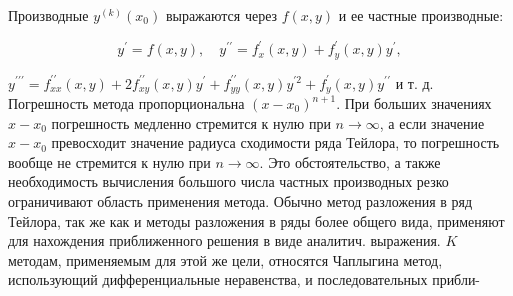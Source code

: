 \documentclass[10pt]{article}
\begin{document}
Производные $y^{(k)}\left(x_{0}\right)$ выражаются через $f(x, y)$ и ее частные производные:



\[

y^{\prime}=f(x, y), \quad y^{\prime \prime}=f_{x}^{\prime}(x, y)+f_{y}^{\prime}(x, y) y^{\prime},

\]



$y^{\prime \prime \prime}=f_{x x}^{\prime \prime}(x, y)+2 f_{x y}^{\prime \prime}(x, y) y^{\prime}+f_{y y}^{\prime \prime}(x, y) y^{\prime 2}+f_{y}^{\prime}(x, y) y^{\prime \prime}$ и т. д. Погрешность метода пропорциональна $\left(x-x_{0}\right)^{n+1}$. При больших значениях $x-x_{0}$ погрешность медленно стремится к нулю при $n \rightarrow \infty$, а если значение $x-x_{0}$ превосходит значение радиуса сходимости ряда Тейлора, то погрешность вообще не стремится к нулю при $n \rightarrow \infty$. Это обстоятельство, а также необходимость вычисления большого числа частных производных резко ограничивают область применения метода. Обычно метод разложения в ряд Тейлора, так же как и методы разложения в ряды более общего вида, применяют для нахождения приближенного решения в виде аналитич. выражения. $K$ методам, применяемым для этой же цели, относятся Чаплыгина метод, использующий дифференциальные неравенства, и последовательных прибли-
\end{document}
